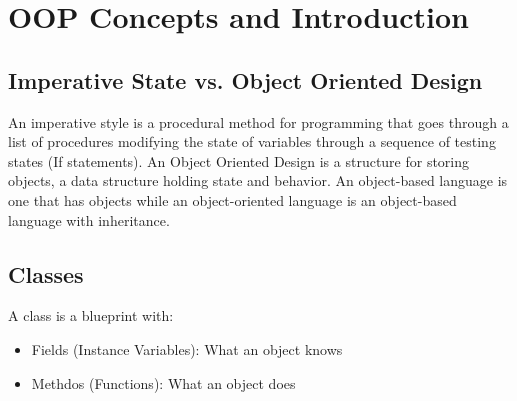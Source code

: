 \documentclass[a4paper, 11pt]{article}
\begin{document}
\section{OOP Concepts and Introduction}

    \subsection{Imperative State vs. Object Oriented Design}
        An imperative style is a procedural method for programming that goes through a list of procedures modifying the state of variables through a sequence of testing states (If statements).
        \newline\newline
        An Object Oriented Design is a structure for storing objects, a data structure holding state and behavior.  An object-based language is one that has objects while an object-oriented language is an object-based language with inheritance.

    \subsection{Classes}
        A class is a blueprint with:
        \begin{itemize}
            \item Fields (Instance Variables): What an object knows
            \item Methdos (Functions): What an object does
        \end{itemize}
\end{document}
